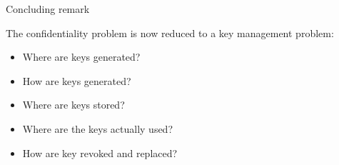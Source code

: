 \documentclass[aspectratio=169, lualatex, handout, 10pt,dvipsnames,svgnames]{beamer} %
\begin{document}
\begin{frame}{Concluding remark}

  The confidentiality problem is now reduced to a key management problem:\medskip
  
  \begin{itemize}
  \item Where are keys generated?\medskip
    
  \item How are keys generated?\medskip
    
  \item Where are keys stored?\medskip
    
  \item Where are the keys actually used?\medskip
    
  \item How are key revoked and replaced? 
  \end{itemize}
  
\end{frame}
\end{document}

